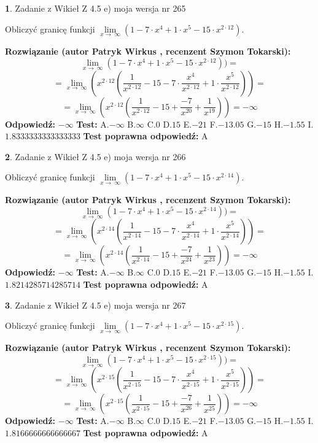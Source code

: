 \documentclass[12pt, a4paper]{article}
\theoremstyle{definition} %
\newtheorem{zad}{}
\newcommand{\zadStart}[1]{\begin{zad}#1\newline}
\newcommand{\zadStop}{\end{zad}}
\newcommand{\rozwStart}[2]{\noindent \textbf{Rozwiązanie (autor #1 , recenzent #2): }\newline}
\newcommand{\rozwStop}{\newline}
\newcommand{\odpStart}{\noindent \textbf{Odpowiedź:}\newline}
\newcommand{\odpStop}{\newline}
\newcommand{\testStart}{\noindent \textbf{Test:}\newline}
\newcommand{\testStop}{\newline}
\newcommand{\kluczStart}{\noindent \textbf{Test poprawna odpowiedź:}\newline}
\newcommand{\kluczStop}{\newline}
\begin{document}
\zadStart{Zadanie z Wikieł Z 4.5 e) moja wersja nr 265}


Obliczyć granicę funkcji  $\lim\limits_{x\to\ \infty}(1 - 7 \cdot x^{4}+1 \cdot x^{5}- 15 \cdot x^{2\cdot12})$.
\zadStop
\rozwStart{Patryk Wirkus}{Szymon Tokarski}
$$\lim\limits_{x\to\ \infty}(1 - 7 \cdot x^{4}+1 \cdot x^{5}- 15 \cdot x^{2\cdot12}))=$$
$$=\lim\limits_{x\to\ \infty}(x^{2\cdot12}(\frac{1}{x^{2\cdot12}}-15 -7 \cdot \frac{x^{4}}{x^{2\cdot12}}+1 \cdot \frac{x^{5}}{x^{2\cdot12}}))=$$
$$=\lim\limits_{x\to\ \infty}(x^{2\cdot12}(\frac{1}{x^{2\cdot12}}-15 + \frac{-7}{x^{20}}+ \frac{1}{x^{19}}))=-\infty$$
\rozwStop
\odpStart
$-\infty$
\odpStop
\testStart
A.$-\infty$ B.$\infty$ C.$0$ D.$15$ E.$-21$
F.$-13.05$ G.$-15$
H.$-1.55$
I.$1.8333333333333333$
\testStop
\kluczStart
A
\kluczStop



\zadStart{Zadanie z Wikieł Z 4.5 e) moja wersja nr 266}


Obliczyć granicę funkcji  $\lim\limits_{x\to\ \infty}(1 - 7 \cdot x^{4}+1 \cdot x^{5}- 15 \cdot x^{2\cdot14})$.
\zadStop
\rozwStart{Patryk Wirkus}{Szymon Tokarski}
$$\lim\limits_{x\to\ \infty}(1 - 7 \cdot x^{4}+1 \cdot x^{5}- 15 \cdot x^{2\cdot14}))=$$
$$=\lim\limits_{x\to\ \infty}(x^{2\cdot14}(\frac{1}{x^{2\cdot14}}-15 -7 \cdot \frac{x^{4}}{x^{2\cdot14}}+1 \cdot \frac{x^{5}}{x^{2\cdot14}}))=$$
$$=\lim\limits_{x\to\ \infty}(x^{2\cdot14}(\frac{1}{x^{2\cdot14}}-15 + \frac{-7}{x^{24}}+ \frac{1}{x^{23}}))=-\infty$$
\rozwStop
\odpStart
$-\infty$
\odpStop
\testStart
A.$-\infty$ B.$\infty$ C.$0$ D.$15$ E.$-21$
F.$-13.05$ G.$-15$
H.$-1.55$
I.$1.8214285714285714$
\testStop
\kluczStart
A
\kluczStop



\zadStart{Zadanie z Wikieł Z 4.5 e) moja wersja nr 267}


Obliczyć granicę funkcji  $\lim\limits_{x\to\ \infty}(1 - 7 \cdot x^{4}+1 \cdot x^{5}- 15 \cdot x^{2\cdot15})$.
\zadStop
\rozwStart{Patryk Wirkus}{Szymon Tokarski}
$$\lim\limits_{x\to\ \infty}(1 - 7 \cdot x^{4}+1 \cdot x^{5}- 15 \cdot x^{2\cdot15}))=$$
$$=\lim\limits_{x\to\ \infty}(x^{2\cdot15}(\frac{1}{x^{2\cdot15}}-15 -7 \cdot \frac{x^{4}}{x^{2\cdot15}}+1 \cdot \frac{x^{5}}{x^{2\cdot15}}))=$$
$$=\lim\limits_{x\to\ \infty}(x^{2\cdot15}(\frac{1}{x^{2\cdot15}}-15 + \frac{-7}{x^{26}}+ \frac{1}{x^{25}}))=-\infty$$
\rozwStop
\odpStart
$-\infty$
\odpStop
\testStart
A.$-\infty$ B.$\infty$ C.$0$ D.$15$ E.$-21$
F.$-13.05$ G.$-15$
H.$-1.55$
I.$1.8166666666666667$
\testStop
\kluczStart
A
\kluczStop
\end{document}

